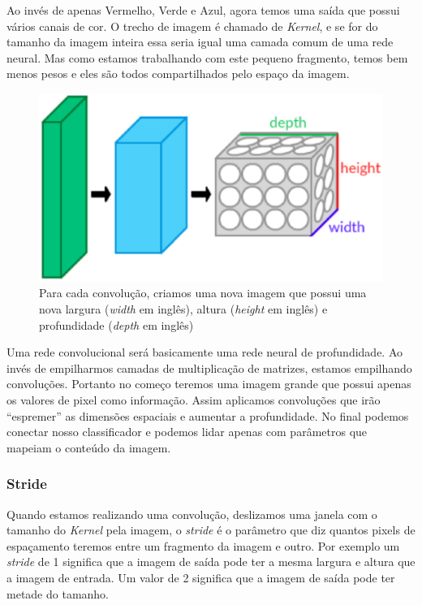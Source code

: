 Ao invés de apenas Vermelho, Verde e Azul, agora temos uma saída que
possui vários canais de cor. O trecho de imagem é chamado de
\textit{Kernel}, e se for do tamanho da imagem inteira essa seria
igual uma camada comum de uma rede neural. Mas como estamos
trabalhando com este pequeno fragmento, temos bem menos pesos e eles
são todos compartilhados pelo espaço da imagem.

\begin{figure}[H]
\centering
\includegraphics[scale=0.6]{imagens/Conv_layers.eps}
\caption{Para cada convolução, criamos uma nova imagem que possui uma
  nova largura (\textit{width} em inglês), altura (\textit{height} em
  inglês) e profundidade (\textit{depth} em inglês)}
\label{fig:convolution_kernel}
\end{figure}

Uma rede convolucional será basicamente uma rede neural de
profundidade. Ao invés de empilharmos camadas de multiplicação de
matrizes, estamos empilhando convoluções. Portanto no começo teremos
uma imagem grande que possui apenas os valores de pixel como
informação. Assim aplicamos convoluções que irão ``espremer'' as
dimensões espaciais e aumentar a profundidade. No final podemos
conectar nosso classificador e podemos lidar apenas com parâmetros que
mapeiam o conteúdo da imagem.\cite{Dumoulin2016}

\subsubsection{Stride}

Quando estamos realizando uma convolução, deslizamos uma janela com o
tamanho do \textit{Kernel} pela imagem, o \textit{stride} é o
parâmetro que diz quantos pixels de espaçamento teremos entre um
fragmento da imagem e outro. Por exemplo um \textit{stride} de 1
significa que a imagem de saída pode ter a mesma largura e altura que
a imagem de entrada. Um valor de 2 significa que a imagem de saída
pode ter metade do tamanho.

